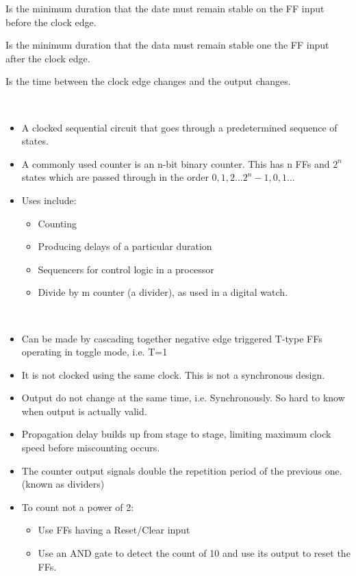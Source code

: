\documentclass[a4paper]{article}
\begin{document}
\begin{defi}
Is the minimum duration that the date must remain stable on the FF input before the clock edge.
\end{defi}

\begin{defi}
Is the minimum duration that the data must remain stable one the FF input after the clock edge.
\end{defi}

\begin{defi}
Is the time between the clock edge changes and the output changes.
\end{defi}

\begin{defi}[Counter]
\ 
\begin{itemize}
\item A clocked sequential circuit that goes through a predetermined sequence of states.
\item A commonly used counter is an n-bit binary counter. This has n FFs and $2^n$ states which are passed through in the order $0,1,2...2^{n}-1,0,1...$
\item Uses include:
\begin{itemize}
\item Counting
\item Producing delays of a particular duration
\item Sequencers for control logic in a processor
\item Divide by m counter (a divider), as used in a digital watch.
\end{itemize}
\end{itemize}
\end{defi}

\begin{defi}
\ 
\begin{itemize}
\item Can be made by cascading together negative edge triggered T-type FFs operating in toggle mode, i.e. T=1
\item It is not clocked using the same clock. This is not a synchronous design.
\item Output do not change at the same time, i.e. Synchronously. So hard to know when output is actually valid.
\item Propagation delay builds up from stage to stage, limiting maximum clock speed before miscounting occurs.
\item The counter output signals double the repetition period of the previous one. (known as dividers)
\item To count not a power of 2:
\begin{itemize}
\item Use FFs having a Reset/Clear input
\item Use an AND gate to detect the count of 10 and use its output to reset the FFs.
\end{itemize}
\end{itemize}
\end{defi}
\end{document}
